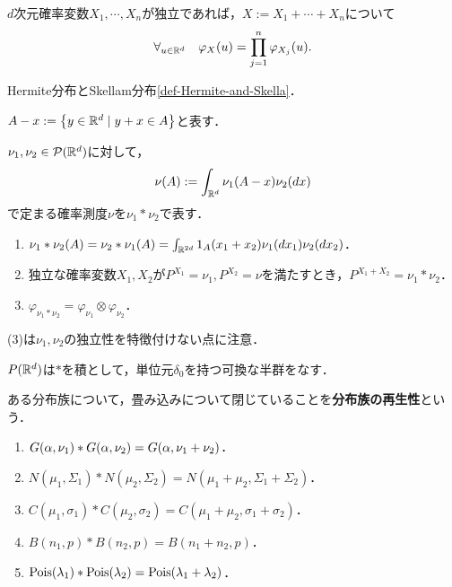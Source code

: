 \documentclass[uplatex,dvipdfmx]{jsreport}
\begin{document}
\begin{corollary}
    $d$次元確率変数$X_1,\cdots,X_n$が独立であれば，$X:=X_1+\cdots+X_n$について
    \[\forall_{u\in\mathbb{R}^d}\quad\varphi_X(u)=\prod^n_{j=1}\varphi_{X_j}(u).\]
\end{corollary}

\begin{example}
    Hermite分布とSkellam分布\ref{def-Hermite-and-Skella}．
\end{example}

\begin{notation}
    $A-x:=\left\{y\in\mathbb{R}^d\mid y+x\in A\right\}$と表す．
\end{notation}

\begin{definition}[convolution]
    $\nu_1,\nu_2\in\mathcal{P}(\mathbb{R}^d)$に対して，
    \[\nu(A):=\int_{\mathbb{R}^d}\nu_1(A-x)\nu_2(dx)\]
    で定まる確率測度$\nu$を$\nu_1*\nu_2$で表す．
\end{definition}

\begin{lemma}\mbox{}
    \begin{enumerate}
        \item $\nu_1*\nu_2(A)=\nu_2*\nu_1(A)=\int_{\mathbb{R}^{2d}}1_A(x_1+x_2)\nu_1(dx_1)\nu_2(dx_2)$．
        \item 独立な確率変数$X_1,X_2$が$P^{X_1}=\nu_1,P^{X_2}=\nu$を満たすとき，$P^{X_1+X_2}=\nu_1*\nu_2$．
        \item $\varphi_{\nu_1*\nu_2}=\varphi_{\nu_1}\otimes\varphi_{\nu_2}$．
    \end{enumerate}
    (3)は$\nu_1,\nu_2$の独立性を特徴付けない点に注意．
\end{lemma}

\begin{lemma}
    $P(\mathbb{R}^d)$は$*$を積として，単位元$\delta_0$を持つ可換な半群をなす．
\end{lemma}

\begin{definition}
    ある分布族について，畳み込みについて閉じていることを\textbf{分布族の再生性}という．
\end{definition}

\begin{example}\mbox{}
    \begin{enumerate}
        \item $G(\alpha,\nu_1)*G(\alpha,\nu_2)=G(\alpha,\nu_1+\nu_2)$．
        \item $N(\mu_1,\Sigma_1)*N(\mu_2,\Sigma_2)=N(\mu_1+\mu_2,\Sigma_1+\Sigma_2)$．
        \item $C(\mu_1,\sigma_1)*C(\mu_2,\sigma_2)=C(\mu_1+\mu_2,\sigma_1+\sigma_2)$．
        \item $B(n_1,p)*B(n_2,p)=B(n_1+n_2,p)$．
        \item $\mathrm{Pois}(\lambda_1)*\mathrm{Pois}(\lambda_2)=\mathrm{Pois}(\lambda_1+\lambda_2)$．
    \end{enumerate}
\end{example}
\end{document}
